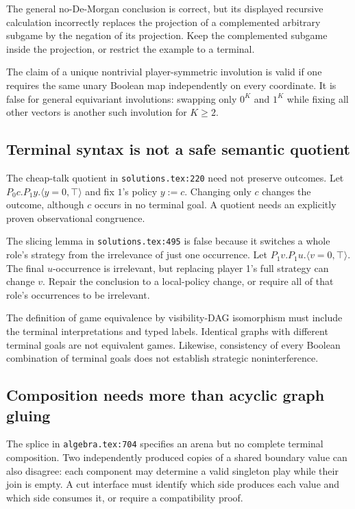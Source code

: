 \documentclass[11pt]{article}
\begin{document}
The general no-De-Morgan conclusion is correct, but its displayed recursive
calculation incorrectly replaces the projection of a complemented arbitrary
subgame by the negation of its projection. Keep the complemented subgame inside
the projection, or restrict the example to a terminal.

The claim of a unique nontrivial player-symmetric involution is valid if one
requires the same unary Boolean map independently on every coordinate. It is
false for general equivariant involutions: swapping only $0^K$ and $1^K$ while
fixing all other vectors is another such involution for $K\ge2$.

\subsection{Terminal syntax is not a safe semantic quotient}

The cheap-talk quotient in \texttt{solutions.tex:220} need not preserve outcomes.
Let $P_0c.P_1y.\langle y=0,\top\rangle$ and fix $1$'s policy $y:=c$. Changing only
$c$ changes the outcome, although $c$ occurs in no terminal goal. A quotient
needs an explicitly proven observational congruence.

The slicing lemma in \texttt{solutions.tex:495} is false because it switches a
whole role's strategy from the irrelevance of just one occurrence. Let
$P_1v.P_1u.\langle v=0,\top\rangle$. The final $u$-occurrence is irrelevant, but
replacing player 1's full strategy can change $v$. Repair the conclusion to a
local-policy change, or require all of that role's occurrences to be irrelevant.

The definition of game equivalence by visibility-DAG isomorphism must include
the terminal interpretations and typed labels. Identical graphs with different
terminal goals are not equivalent games. Likewise, consistency of every Boolean
combination of terminal goals does not establish strategic noninterference.

\subsection{Composition needs more than acyclic graph gluing}

The splice in \texttt{algebra.tex:704} specifies an arena but no complete terminal
composition. Two independently produced copies of a shared boundary value can
also disagree: each component may determine a valid singleton play while their
join is empty. A cut interface must identify which side produces each value and
which side consumes it, or require a compatibility proof.
\end{document}
